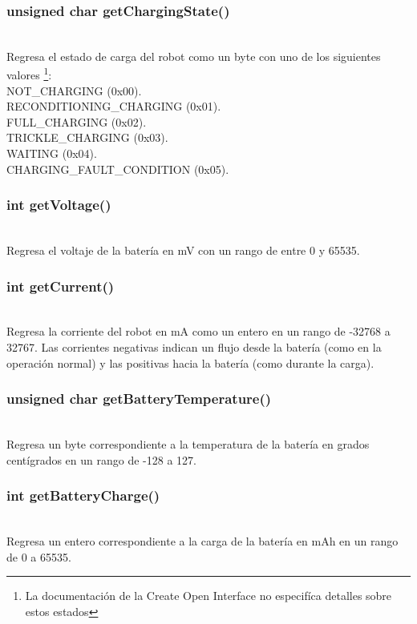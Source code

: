 \documentclass[letterpaper]{book}
\begin{document}
\subsubsection{unsigned char getChargingState()}\mbox{}\\
Regresa el estado de carga del robot como un byte con uno de los siguientes valores \footnote{La documentación de la Create Open Interface no especifíca detalles sobre estos estados}:\\
NOT\_CHARGING (0x00). \\
RECONDITIONING\_CHARGING (0x01). \\
FULL\_CHARGING (0x02).\\
TRICKLE\_CHARGING (0x03).\\
WAITING (0x04).\\
CHARGING\_FAULT\_CONDITION (0x05).\\

\subsubsection{int getVoltage()}\mbox{}\\
Regresa el voltaje de la batería en mV con un rango de entre 0 y 65535.\\
\subsubsection{int getCurrent()}\mbox{}\\
Regresa la corriente del robot en mA como un entero en un rango de  -32768 a 32767. Las corrientes negativas indican un flujo desde la batería (como en la operación normal) y las positivas hacia la batería (como durante la carga).\\

\subsubsection{unsigned char getBatteryTemperature()}\mbox{}\\
Regresa un byte correspondiente a la temperatura de la batería en grados centígrados en un rango de -128 a 127.\\
\subsubsection{int getBatteryCharge()}\mbox{}\\
Regresa un entero correspondiente a la carga de la batería en mAh  en un rango de 0 a 65535.\\
\end{document}
